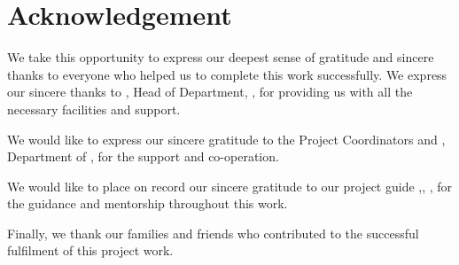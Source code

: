 \chapter*{Acknowledgement}%
%

\par We take this opportunity to express our deepest sense of gratitude and sincere thanks to everyone who helped us to complete this work successfully. We express our sincere thanks to \textbf{\cHod}, Head of Department, \dept, \college\hspace*{2pt} for providing  us with all the necessary facilities and support.\par

We would like to express our sincere gratitude to the Project Coordinators \textbf{\cCordTwo} and \textbf{\cCordOne}, \hspace*{2pt} Department of \hspace*{2pt} \dept, \hspace*{2pt} \college \hspace*{2pt} \hspace*{2pt} for the support and co-operation.

We would like to place on record our sincere gratitude to our project guide \textbf{\cGuide},\hspace*{2pt}\cGuideDes, \hspace*{2pt}\dept, \hspace*{2pt}\college \hspace*{2pt} 
for the guidance and mentorship throughout this work.

Finally, we thank our families and friends who contributed to the successful fulfilment of this project work.

\vspace*{30pt}
\begin{flushright}
	\textbf{\cMembOne}\\
	\textbf{\cMembTwo}\\
	\textbf{\cMembThree}\\
	\textbf{\cMembFour}\\
\end{flushright}
\thispagestyle{plain}
